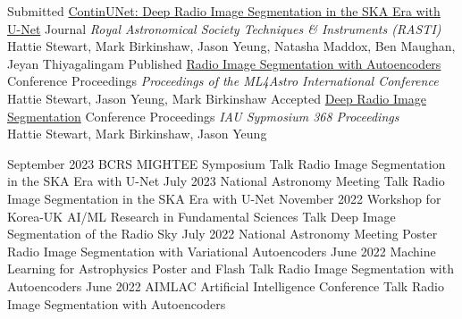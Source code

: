 \documentclass[9pt]{developercv} %
\begin{document}
\begin{entrylist}
    \entry
		{Submitted}
		{\href{https://hstewart93.github.io/files/continunet_rasti_29_02_2024.pdf}{ContinUNet: Deep Radio Image Segmentation in the SKA Era with U-Net}}
		{Journal}
		{\textnormal{\textit{Royal Astronomical Society Techniques \& Instruments         (RASTI)}} \\
            Hattie Stewart, Mark Birkinshaw, Jason Yeung, Natasha Maddox, Ben Maughan,    Jeyan Thiyagalingam}
    \entry
		{Published}
		{\href{https://doi.org/10.1007/978-3-031-34167-0_28}{Radio Image Segmentation with Autoencoders}}
		{Conference Proceedings}
		{\textnormal{\textit{Proceedings of the ML4Astro International Conference}} \\Hattie Stewart, Jason Yeung, Mark Birkinshaw}
	\entry
		{Accepted}
		{\href{https://hstewart93.github.io/files/Proceedings_of_the_International_Astronomical_Union_Deep_Radio_Image_Segmentation.pdf}{Deep Radio Image Segmentation}}
		{Conference Proceedings}
		{\textnormal{\textit{IAU Sypmosium 368 Proceedings}} \\Hattie Stewart, Mark Birkinshaw, Jason Yeung}
\end{entrylist}

\vspace{-10 pt}
\begin{entrylist}
    \entry
		{September 2023}
		{BCRS MIGHTEE Symposium}
		{Talk}
		{Radio Image Segmentation in the SKA Era with U-Net}
    \entry
		{July 2023}
		{National Astronomy Meeting}
		{Talk}
		{Radio Image Segmentation in the SKA Era with U-Net}
    \entry
		{November 2022}
		{Workshop for Korea-UK AI/ML Research in Fundamental Sciences}
		{Talk}
		{Deep Image Segmentation of the Radio Sky}
    \entry
		{July 2022}
		{National Astronomy Meeting}
		{Poster}
		{Radio Image Segmentation with Variational Autoencoders}
	\entry
		{June 2022}
		{Machine Learning for Astrophysics}
		{Poster and Flash Talk}
		{Radio Image Segmentation with Autoencoders}
        \entry
		{June 2022}
		{AIMLAC Artificial Intelligence Conference}
		{Talk}
		{Radio Image Segmentation with Autoencoders}
\end{entrylist}
\end{document}
